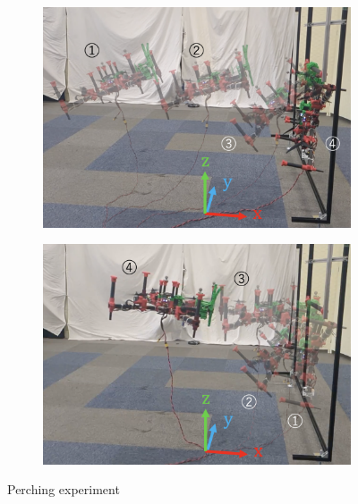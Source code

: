 \documentclass{jarticle}
\begin{document}
\begin{figure}[h]
  \centering
  \begin{subfigure}{0.38\columnwidth}
    \includegraphics[width=\textwidth]{figs/attaching.eps}
    \vspace{-6mm}
    \caption{}
    \label{fig:perching1}
  \end{subfigure}
  \begin{subfigure}{0.38\columnwidth}
    \includegraphics[width=\textwidth]{figs/detaching.eps}
    \vspace{-6mm}
    \caption{}
    \label{fig:perching2}
  \end{subfigure}
  \vspace{1mm}
  \caption{Perching experiment}
  \label{fig:perching}
  \vspace{-4mm}
\end{figure}
\end{document}
